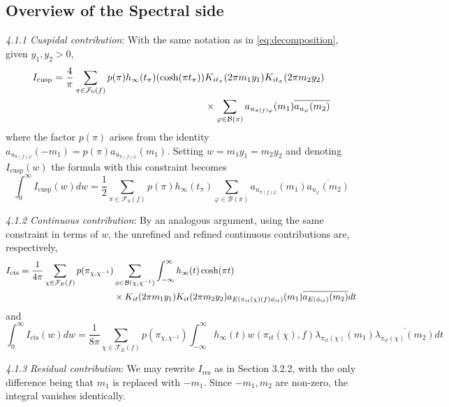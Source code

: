 \documentclass{article}
\numberwithin{equation}{section}
\begin{document}
\subsection{Overview of the Spectral side}\label{section:spectral-overview-opposite-signs}
\emph{4.1.1 Cuspidal contribution}: With the same notation as in \eqref{eq:decomposition}, given $y_1,y_2>0$,
\begin{align}\label{eq:cusp-unrefined-oppositesigns}
        I_\text{cusp}=\frac{4}{\pi}\sum_{\pi \in \mathcal{F}_0(f)}p(\pi)h_\infty(t_\pi)(\cosh (\pi t_\pi))& K_{it_\pi}(2\pi m_1y_1)K_{it_\pi}(2\pi m_2 y_2)\notag  \\
        & \times\sum_{\varphi \in \mathcal{B}(\pi)}a_{u_{\pi(f)\varphi}}(m_1)\overline{a_{u_\varphi}(m_2)}  
\end{align}
where the factor $p(\pi)$ arises from the identity $a_{u_{\pi(f)\varphi}}(-m_1)=p(\pi)a_{u_{\pi(f)\varphi}}(m_1)$.
Setting $w=m_1y_1=m_2y_2$ and denoting $I_\text{cusp}(w)$ the formula with this constraint becomes
\begin{equation}\label{eq:opposite-sign-cusp-refined}
    \int_{0}^{\infty}I_\text{cusp}(w)dw=\frac{1}{2}\sum_{\pi \in \mathcal{F}_0(f)}p(\pi)h_\infty(t_\pi)\sum_{\varphi \in\mathcal{B}(\pi)}a_{u_{\pi(f)\varphi}}(m_1)\overline{a_{u_{\varphi}}(m_2)}
\end{equation} \bigbreak

\noindent \emph{4.1.2 Continuous contribution}: By an analogous argument, using the same constraint in terms of $w$, the unrefined and refined continuous contributions are, respectively,
\begin{align}\label{eq:unrefined-cts}
    I_\text{cts}=\frac{1}{4\pi}\sum_{\chi \in \mathcal{F}_E(f)}p(\pi_{\chi,\chi^{-1}})& \sum_{\phi \in \mathcal{B}(\chi,\chi^{-1})} \int_{-\infty}^{\infty}{h}_\infty
(t)\cosh(\pi t)\notag \\ &\times K_{it}(2\pi m_1y_1)K_{it}(2\pi m_2y_2)a_{E(\pi_{it}(\chi)(f)\phi_{it})}(m_1)\overline{a_{E(\phi_{it})}(m_2)}dt\end{align}
and
\begin{equation}\label{eq:opposite-sign-cts-refined}
    \int_{0}^{\infty}I_{\text{cts}}(w)dw = \frac{1}{8\pi}\sum_{\chi \in \mathcal{F}_E(f)}p(\pi_{\chi,\chi^{-1}})\int_{-\infty}^{\infty}h_\infty(t)w(\pi_{it}(\chi),f)\lambda_{\pi_{it}(\chi)}(m_1)\overline{\lambda_{\pi_{it}(\chi)}(m_2)}dt
\end{equation} \bigbreak 


\noindent \emph{4.1.3 Residual contribution}: We may rewrite $I_\text{res}$ as in Section 3.2.2, with the only difference being that $m_1$ is replaced with $-m_1$. Since $-m_1,m_2$ are non-zero, the integral vanishes identically. \bigbreak
\end{document}
